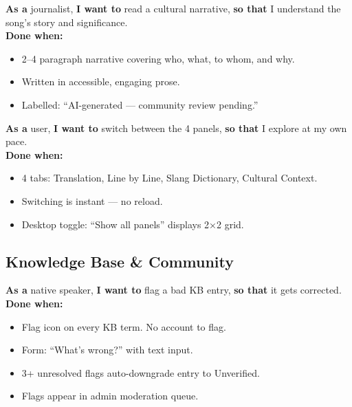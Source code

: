 \documentclass[12pt, a4paper]{article}
\begin{document}
\begin{tcolorbox}[storybox, title={US-10 — View Cultural Context}]
  \textbf{As a} journalist, \textbf{I want to} read a cultural narrative,
  \textbf{so that} I understand the song's story and significance.\\[0.4em]
  \textbf{Done when:}
  \begin{itemize}
    \item 2--4 paragraph narrative covering who, what, to whom, and why.
    \item Written in accessible, engaging prose.
    \item Labelled: ``AI-generated — community review pending.''
  \end{itemize}
\end{tcolorbox}

\begin{tcolorbox}[storybox, title={US-11 — Switch Output Panels}]
  \textbf{As a} user, \textbf{I want to} switch between the 4 panels,
  \textbf{so that} I explore at my own pace.\\[0.4em]
  \textbf{Done when:}
  \begin{itemize}
    \item 4 tabs: Translation, Line by Line, Slang Dictionary, Cultural Context.
    \item Switching is instant — no reload.
    \item Desktop toggle: ``Show all panels'' displays 2×2 grid.
  \end{itemize}
\end{tcolorbox}

\subsection{Knowledge Base \& Community}

\begin{tcolorbox}[storybox, title={US-12 — Flag a Wrong Definition}]
  \textbf{As a} native speaker, \textbf{I want to} flag a bad KB entry,
  \textbf{so that} it gets corrected.\\[0.4em]
  \textbf{Done when:}
  \begin{itemize}
    \item Flag icon on every KB term. No account to flag.
    \item Form: ``What's wrong?'' with text input.
    \item 3+ unresolved flags auto-downgrade entry to Unverified.
    \item Flags appear in admin moderation queue.
  \end{itemize}
\end{tcolorbox}
\end{document}
